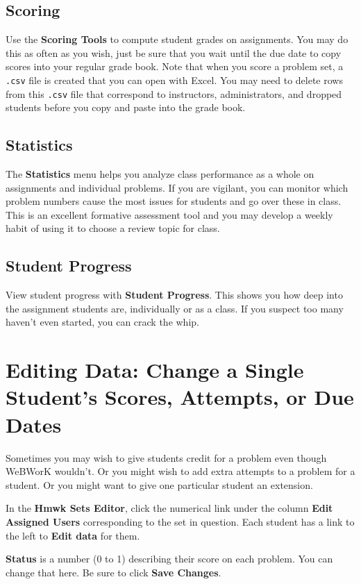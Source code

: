 \documentclass[12pt]{article}
\newcommand{\menu}[1]{\textbf{#1}}
\newcommand{\HSE}{\menu{Hmwk Sets Editor}}
\begin{document}
\subsection{Scoring}
Use the \menu{Scoring Tools} to compute student grades on assignments.  You may do this as often as you wish, just be sure that you wait until the due date to copy scores into your regular grade book.  Note that when you score a problem set, a \texttt{.csv} file is created that you can open with Excel. You may need to delete rows from this \texttt{.csv} file that correspond to instructors, administrators, and dropped students before you copy and paste into the grade book.

\subsection{Statistics}
The \menu{Statistics} menu helps you analyze class performance as a whole on assignments and individual problems.  If you are vigilant, you can monitor which problem numbers cause the most issues for students and go over these in class. This is an excellent formative assessment tool and you may develop a weekly habit of using it to choose a review topic for class.

\subsection{Student Progress}
View student progress with \menu{Student Progress}.  This shows you how deep into the assignment students are, individually or as a class.  If you suspect too many haven't even started, you can crack the whip.


\section{Editing Data: Change a Single Student's Scores, Attempts, or Due Dates}
Sometimes you may wish to give students credit for a problem even though WeBWorK wouldn't.  Or you might wish to add extra attempts to a problem for a student.  Or you might want to give one particular student an extension.

In the \HSE, click the numerical link under the column \menu{Edit Assigned Users} corresponding to the set in question.  Each student has a link to the left to \menu{Edit data} for them.

\menu{Status} is a number (0 to 1) describing their score on each problem.  You can change that here.  Be sure to click \menu{Save Changes}.
\end{document}
